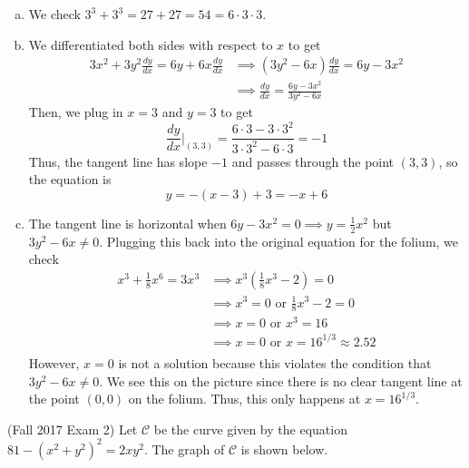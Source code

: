 \documentclass[11pt]{exam}
\newcommand{\dydx}{\frac{dy}{dx}}
\begin{document}
\begin{questions}
\begin{enumerate}[(a)]
 \end{enumerate}
 \begin{solution}
   \begin{enumerate}[(a)]
   \item We check \(3^3+3^3 = 27+27 = 54 = 6 \cdot 3 \cdot 3\).
   \item We differentiated both sides with respect to \(x\) to get
     \begin{align*}
       3x^2 + 3y^2 \dydx = 6y+6x\dydx
       & \implies (3y^2-6x)\dydx = 6y-3x^2 \\
       & \implies \dydx = \frac{6y-3x^2}{3y^2-6x}
     \end{align*}
     Then, we plug in \(x = 3\) and \(y=3\) to get \[
       \dydx \rvert_{(3,3)} = \frac{6 \cdot 3 - 3 \cdot 3^2}{3 \cdot 3^2-6
         \cdot 3} = -1
     \]
     Thus, the tangent line has slope \(-1\) and passes through the point
     \((3,3)\), so the equation is \[
       y = -(x-3)+3 = -x+6
     \]
     \item The tangent line is horizontal when \(6y-3x^2 = 0 \implies
       y = \frac{1}{2}x^2\) but \(3y^2-6x \neq 0\). Plugging this back into the original
       equation for the folium, we check
       \begin{align*}
         x^3 + \frac{1}{8} x^6 = 3x^3
         & \implies x^3(\frac{1}{8}x^3-2) = 0\\
         & \implies x^3 = 0 \text{ or } \frac{1}{8}x^3-2 = 0 \\
         &  \implies x = 0 \text{ or } x^3 = 16 \\
         &  \implies x = 0 \text{ or } x = 16^{1/3} \approx 2.52\\
       \end{align*}
       However, \(x=0\) is not a solution because this violates the
       condition that \(3y^2-6x \neq 0\). We see this on the picture
       since there is no clear tangent line at the point \((0,0)\) on
       the folium. Thus, this only happens at \(x=16^{1/3}\).
   \end{enumerate}
 \end{solution}
\pagebreak
\question (Fall 2017 Exam 2) %
Let $\mathcal{C}$ be the curve given by the equation $81-(x^2+y^2)^2=2xy^2$. The graph of $\mathcal{C}$ is shown below.
\begin{multicols}{2}
  \begin{center}

\end{center}
\end{multicols}
\end{questions}
\end{document}
